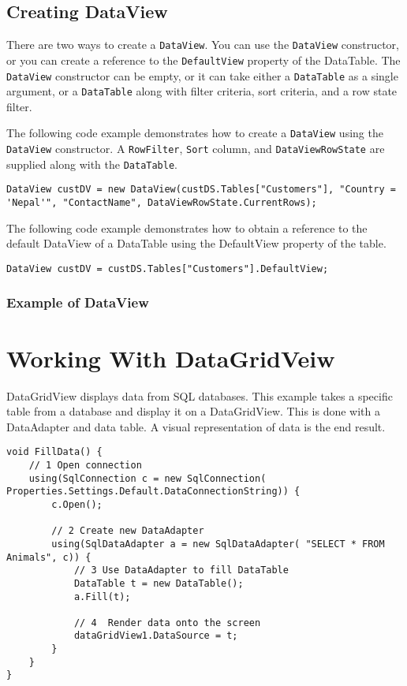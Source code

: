 \subsection*{Creating DataView}
There are two ways to create a \texttt{DataView}. You can use the \texttt{DataView} constructor, or you can create a reference
to the \texttt{DefaultView} property of the DataTable. The \texttt{DataView} constructor can be empty, or it can take either a
\texttt{DataTable} as a single argument, or a \texttt{DataTable} along with filter criteria, sort criteria, and a row state filter.

The following code example demonstrates how to create a \texttt{DataView} using the \texttt{DataView} constructor. A \texttt{RowFilter},
\texttt{Sort} column, and \texttt{DataViewRowState} are supplied along with the \texttt{DataTable}.


\begin{lstlisting}
DataView custDV = new DataView(custDS.Tables["Customers"], "Country = 'Nepal'", "ContactName", DataViewRowState.CurrentRows);
\end{lstlisting}

The following code example demonstrates how to obtain a reference to the default DataView of a DataTable using the DefaultView property of the table.
\begin{lstlisting}
DataView custDV = custDS.Tables["Customers"].DefaultView;
\end{lstlisting}

\subsubsection*{Example of DataView}


\section{Working With DataGridVeiw}
DataGridView displays data from SQL databases. This example takes a specific table from a database and display
it on a DataGridView. This is done with a DataAdapter and data table. A visual representation of data is the end
result.

\begin{lstlisting}[caption=Working with DataGridView.]
void FillData() {
	// 1 Open connection
	using(SqlConnection c = new SqlConnection( Properties.Settings.Default.DataConnectionString)) {
		c.Open(); 
		
		// 2 Create new DataAdapter
		using(SqlDataAdapter a = new SqlDataAdapter( "SELECT * FROM Animals", c)) {
			// 3 Use DataAdapter to fill DataTable
			DataTable t = new DataTable();
			a.Fill(t);
			
			// 4  Render data onto the screen
			dataGridView1.DataSource = t;
		}
	}
}
\end{lstlisting}

